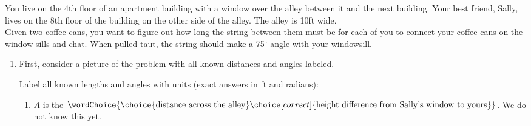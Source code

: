 \documentclass{ximera}
\author{Elizabeth Campolongo}
\begin{document}
\begin{exercise}

You live on the 4th floor of an apartment building with a window over the alley between it and the next building. Your best friend, Sally, lives on the 8th floor of the building on the other side of the alley.
The alley is 10ft wide. \\
Given two coffee cans, you want to figure out how long the string between them must be for each of you to connect your coffee cans on the window sills and chat. When pulled taut, the string should make a 75$^\circ$ angle with your windowsill. 
%
\begin{enumerate}

\item
First, consider a picture of the problem with all known distances and angles labeled.

		\begin{image}[2in]
		\end{image}

Label all known lengths and angles with units (exact answers in ft and radians):
\begin{enumerate}
\item $A$ is the $\wordChoice{\choice{\text{distance across the alley}}\choice[correct]{\text{height difference from Sally's window to yours}}}$. We do not know this yet.


\end{enumerate}
\end{enumerate}
\end{exercise}
\end{document}
